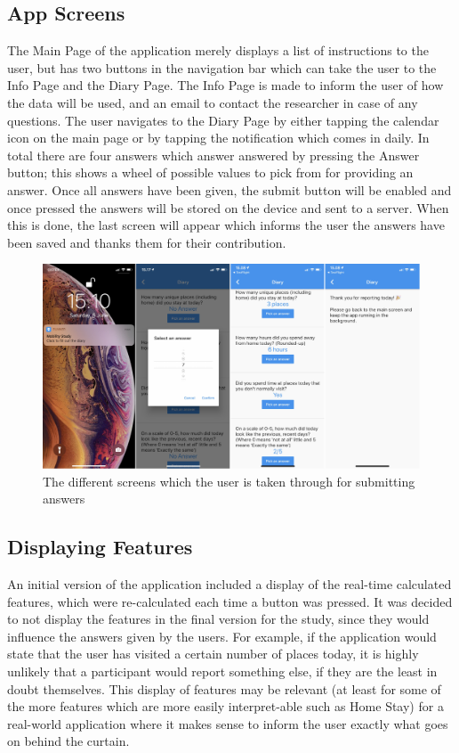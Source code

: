 \subsection{App Screens}
The Main Page of the application merely displays a list of instructions to the user, but has two buttons in the navigation bar which can take the user to the Info Page and the Diary Page. The Info Page is made to inform the user of how the data will be used, and an email to contact the researcher in case of any questions. The user navigates to the Diary Page by either tapping the calendar icon on the main page or by tapping the notification which comes in daily. In total there are four answers which answer answered by pressing the Answer button; this shows a wheel of possible values to pick from for providing an answer. Once all answers have been given, the submit button will be enabled and once pressed the answers will be stored on the device and sent to a server. When this is done, the last screen will appear which informs the user the answers have been saved and thanks them for their contribution.

\begin{figure}
    \centering
    \includegraphics[width=\textwidth]{images/app_imgs/screens-answers.pdf}
    \caption{The different screens which the user is taken through for submitting answers}
    \label{fig:screens-answers}
\end{figure}

\subsection{Displaying Features}
An initial version of the application included a display of the real-time calculated features, which were re-calculated each time a button was pressed. It was decided to not display the features in the final version for the study, since they would influence the answers given by the users. For example, if the application would state that the user has visited a certain number of places today, it is highly unlikely that a participant would report something else, if they are the least in doubt themselves. This display of features may be relevant (at least for some of the more features which are more easily interpret-able such as Home Stay) for a real-world application where it makes sense to inform the user exactly what goes on behind the curtain.

